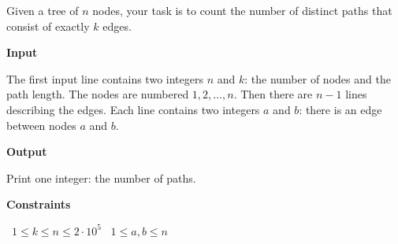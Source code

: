 Given a tree of $n$ nodes, your task is to count the number of distinct paths that consist of exactly $k$ edges.

\vspace{0.3cm}\noindent\textbf{Input}

The first input line contains two integers $n$ and $k$: the number of nodes and the path length. The nodes are numbered $1,2,\ldots,n$.
Then there are $n-1$ lines describing the edges. Each line contains two integers $a$ and $b$: there is an edge between nodes $a$ and $b$.

\vspace{0.3cm}\noindent\textbf{Output}

Print one integer: the number of paths.

\vspace{0.3cm}\noindent\textbf{Constraints}

\textbullet\ $1 \le k \le n \le 2 \cdot 10^5$
\textbullet\ $1 \le a,b \le n$